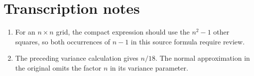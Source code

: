 \documentclass[11pt,a4paper]{article}
\begin{document}
\section*{Transcription notes}
\begin{enumerate}
\item For an $n\times n$ grid, the compact expression should use the $n^2-1$ other squares, so both occurrences of $n-1$ in this source formula require review.
\item The preceding variance calculation gives $n/18$. The normal approximation in the original omits the factor $n$ in its variance parameter.
\end{enumerate}
\end{document}
